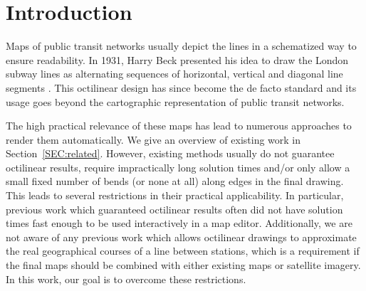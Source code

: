 \documentclass[sigconf]{acmart}
\begin{document}


\maketitle

\section{Introduction}

Maps of public transit networks usually depict the lines in a schematized way to ensure readability.
In 1931, Harry Beck presented his idea to draw the London subway lines as alternating sequences of horizontal, vertical and diagonal line segments \cite{garl94}.
This octilinear design has since become the de facto standard and its usage goes beyond the cartographic representation of public transit networks.

The high practical relevance of these maps has lead to numerous approaches to render them automatically.
We give an overview of existing work in Section~\ref{SEC:related}.
However, existing methods usually do not guarantee octilinear results, require impractically long solution times and/or only allow a small fixed number of bends (or none at all) along edges in the final drawing.
This leads to several restrictions in their practical applicability.
In particular, previous work which guaranteed octilinear results often did not have solution times fast enough to be used interactively in a map editor.
Additionally, we are not aware of any previous work which allows octilinear drawings to approximate the real geographical courses of a line between stations, which is a requirement if the final maps should be combined with either existing maps or satellite imagery.
In this work, our goal is to overcome these restrictions.
\end{document}
